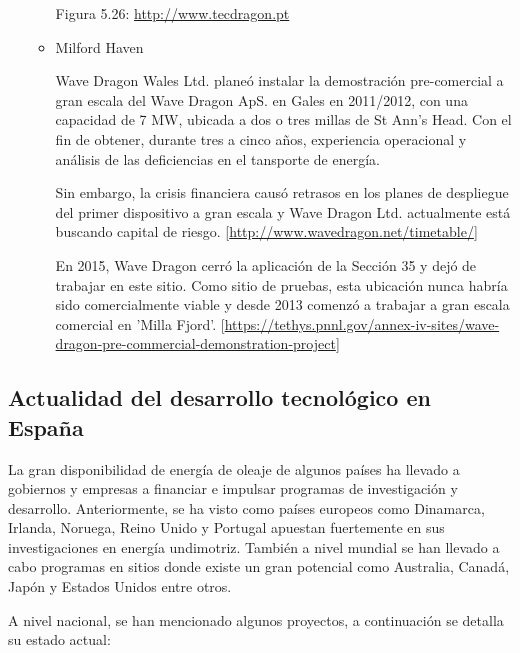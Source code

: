 \begin{itemize}
\begin{itemize}
    Figura 5.26: \url{http://www.tecdragon.pt}
  \item
    Milford Haven

    Wave Dragon Wales Ltd. planeó instalar la demostración pre-comercial
    a gran escala del Wave Dragon ApS. en Gales en 2011/2012, con una
    capacidad de 7 MW, ubicada a dos o tres millas de St Ann's Head. Con
    el fin de obtener, durante tres a cinco años, experiencia
    operacional y análisis de las deficiencias en el tansporte de
    energía.

    Sin embargo, la crisis financiera causó retrasos en los planes de
    despliegue del primer dispositivo a gran escala y Wave Dragon Ltd.
    actualmente está buscando capital de riesgo.
    {[}\url{http://www.wavedragon.net/timetable/}{]}

    En 2015, Wave Dragon cerró la aplicación de la Sección 35 y dejó de
    trabajar en este sitio. Como sitio de pruebas, esta ubicación nunca
    habría sido comercialmente viable y desde 2013 comenzó a trabajar a
    gran escala comercial en 'Milla Fjord'.
    {[}\url{https://tethys.pnnl.gov/annex-iv-sites/wave-dragon-pre-commercial-demonstration-project}{]}
  \end{itemize}
\end{itemize}

\subsection{Actualidad del desarrollo tecnológico en España}\label{header-n430}

La gran disponibilidad de energía de oleaje de algunos países ha llevado
a gobiernos y empresas a financiar e impulsar programas de investigación
y desarrollo. Anteriormente, se ha visto como países europeos como
Dinamarca, Irlanda, Noruega, Reino Unido y Portugal apuestan fuertemente
en sus investigaciones en energía undimotriz. También a nivel mundial se
han llevado a cabo programas en sitios donde existe un gran potencial
como Australia, Canadá, Japón y Estados Unidos entre otros.

A nivel nacional, se han mencionado algunos proyectos, a continuación se
detalla su estado actual:

